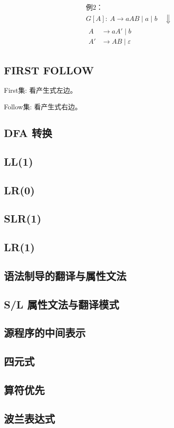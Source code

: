 \[
\begin{aligned}
&\text{例2：}\\
&G[A]:\ A \to aAB \mid a \mid b
\quad\Downarrow\\[4pt]
&\begin{aligned}
A &\to aA' \mid b \\
A' &\to AB \mid \varepsilon
\end{aligned}
\end{aligned}
\]

\subsection*{FIRST FOLLOW}
First集: 看产生式左边。 \par
Follow集: 看产生式右边。 \par


\subsection*{DFA 转换}

\subsection*{LL(1)}

\subsection*{LR(0)}

\subsection*{SLR(1)}

\subsection*{LR(1)}

\subsection*{语法制导的翻译与属性文法}

\subsection*{S/L 属性文法与翻译模式}

\subsection*{源程序的中间表示}

\subsection*{四元式}

\subsection*{算符优先}

\subsection*{波兰表达式}
